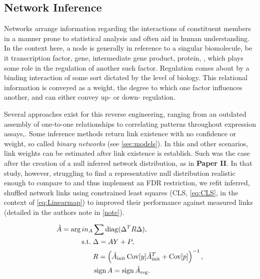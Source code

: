 \subsection{Network Inference}
\label{sec:netinf}
Networks arrange information regarding the interactions of constituent members in a manner prone to statistical analysis and often aid in human understanding. In the context here, a node is generally in reference to a singular biomolecule, be it transcription factor, gene, intermediate gene product, protein, \etc, which plays some role in the regulation of another such factor. Regulation comes about by a binding interaction of some sort dictated by the level of biology. This relational information is conveyed as a weight, the degree to which one factor influences another, and can either convey up- or down- regulation.

Several approaches exist for this reverse engineering, ranging from an outdated assembly of one-to-one relationships to correlating patterns throughout expression assays,\etc. Some inference methods return link existence with no confidence or weight, so called \emph{binary networks} (see \cref{sec:models}). In this and other scenarios, link weights can be estimated after link existence is establish. Such was the case after the creation of a null inferred network distribution, as in \textbf{Paper II}. In that study, however, struggling to find a representative null distribution realistic enough to compare to and thus implement an FDR restriction, we refit inferred, shuffled network links using constrained least squares (CLS, \cref{eq:CLS}, \citep{grant2008cvx} in the context of \cref{eq:Linearmap}) to improved their performance against measured links (detailed in the authors note in \cref{note}). 


\begin{equation}%
\begin{aligned}\label{eq:CLS}
  \hat{A} = \arg in_{A} & \sum \diag(\Delta^TR \Delta), \\
  \text{s.t.}\; & \Delta = A Y + P, \\
  & R = \left( \hat{A}_{\textrm{init}} \Cov[y] \hat{A}_{\textrm{init}}^{T} + \Cov[p]\right)^{-1},\\ %
  & \sign{A} = \sign{\hat{A}_{\textrm{reg}}}. \\
\end{aligned}
\end{equation}

